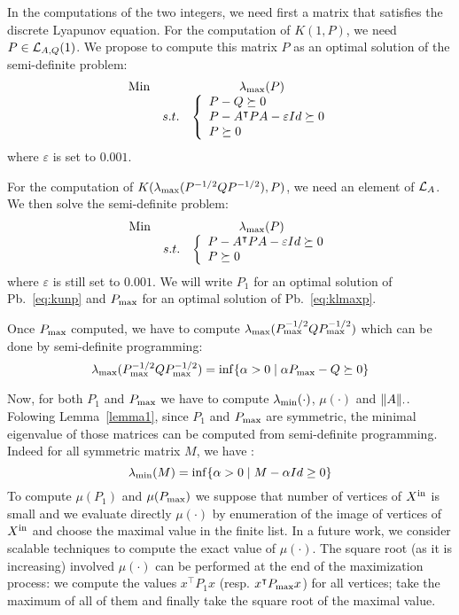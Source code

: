 \documentclass[10pt]{article}
\begin{document}
In the computations of the two integers, we need first a matrix that satisfies the discrete Lyapunov equation. For the computation of $K(1,P)$, we need $P \in \mathcal{L}_{A,Q}(1)$. We propose to compute this matrix $P$ as an optimal solution  of the semi-definite problem:
\begin{equation}
\label{eq:kunp}
\begin{array}{llc}
\operatorname*{Min} & &\lambda_{\operatorname{max}}(P)\\
 & s. t. &\left\{\begin{array}{l} 
         P-Q\succeq 0\\
         P-A^\intercal P A-\varepsilon Id\succeq 0\\
         P\succeq  0
        \end{array}\right.
\end{array}
\end{equation}
where $\varepsilon$ is set to $0.001$.

For the computation of $K(\lambda_{\operatorname{max}}(P^{-1/2}QP^{-1/2}),P)$, we need an element of $\mathcal{L}_{A}$. We then solve the semi-definite problem:
\begin{equation}
\label{eq:klmaxp}
\begin{array}{llc}
\operatorname*{Min} & &\lambda_{\operatorname{max}}(P)\\
 & s. t. &\left\{\begin{array}{l} 
         P-A^\intercal P A-\varepsilon Id\succeq 0\\
         P\succeq  0
        \end{array}\right.
\end{array}
\end{equation}
where $\varepsilon$ is still set to $0.001$.
We will write $P_1$ for an optimal solution of Pb.~\eqref{eq:kunp} and $P_{\mathrm{max}}$ for an optimal solution of Pb.~\eqref{eq:klmaxp}. 

Once $P_{\mathrm{max}}$ computed, we have to compute $\lambda_{\operatorname{max}}(P_{\mathrm{max}}^{-1/2}Q P_{\mathrm{max}}^{-1/2})$ which can be done by semi-definite programming:
\[
\lambda_{\operatorname{max}}(P_{\mathrm{max}}^{-1/2}Q P_{\mathrm{max}}^{-1/2})=\inf\{\alpha>0\mid \alpha P_{\mathrm{max}}-Q\succeq 0\}
\] 

Now, for both $P_1$ and $P_{\mathrm{max}}$ we have to compute $\lambda_{\operatorname{min}}(\cdot)$, $\mu(\cdot)$ and $\| A\|_{\cdot}$. Folowing Lemma~\ref{lemma1}, since $P_1$ and $P_{\mathrm{max}}$ are symmetric, the minimal eigenvalue
of those matrices can be computed from semi-definite programming. Indeed for all symmetric matrix $M$, we have : 
\[
\lambda_{\operatorname{min}}(M)=\inf\{\alpha>0\mid M-\alpha Id\geq 0\}
\] 
To compute $\mu(P_1)$ and $\mu(P_{\mathrm{max}})$ we suppose that number of vertices of $X^\mathrm{in}$ is small and we evaluate directly $\mu(\cdot)$ by enumeration of the image of vertices of $X^\mathrm{in}$ and choose the maximal value in the finite list. In a future work, we consider scalable techniques to compute the exact value of $\mu(\cdot)$. The square root (as it is increasing) involved $\mu(\cdot)$ can be performed at the end of the maximization process: we compute the values $x^\intercal P_1 x$ (resp. $x^\intercal P_{\mathrm{max}} x$) for all vertices; take the maximum of all of them and finally take the square root of the maximal value. 
\end{document}
